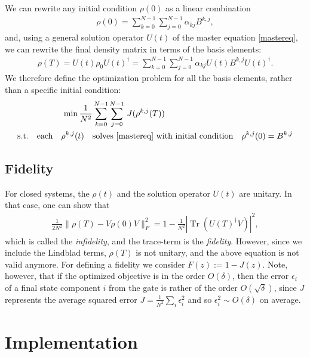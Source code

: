 \documentclass[letterpaper]{article}
\DeclareMathOperator{\Tr}{Tr}
\begin{document}
We can rewrite any initial condition $\rho(0)$ as a linear combination 
\begin{align}
  \rho(0) = \sum_{k=0}^{N-1} \sum_{j=0}^{N-1} \alpha_{kj} B^{k, j},
\end{align}
and, using a general solution operator $U(t)$ of the master equation \eqref{mastereq}, we can rewrite the final density matrix in terms of the basis elements:
\begin{align}
  \rho(T) = U(t) \rho_0 U(t)^\dag = \sum_{k=0}^{N-1} \sum_{j=0}^{N-1} \alpha_{kj} U(t)B^{k, j}U(t)^\dag.
\end{align}
We therefore define the optimization problem for all the basis elements, rather than a specific initial condition:
\begin{align}\label{optimproblem_basis}
  \min \frac{1}{N^2} & \sum_{k=0}^{N-1}\sum_{j=0}^{N-1} \, J(\rho^{k,j}(T))  \\
  \text{s.t.} \quad  \text{each} \quad \rho^{k,j}(t) \quad & \text{solves \eqref{mastereq} with initial condition} \quad \rho^{k,j}(0) = B^{k,j}
\end{align}


\subsection{Fidelity} 
For closed systems, the $\rho(t)$ and the solution operator $U(t)$ are unitary. In that case, one can show that 
\begin{align}
  \frac{1}{2N^2}\|\rho(T) - V\rho(0)V\|_F^2 = 1 - \frac{1}{N^2}|\Tr(U(T)^{\dagger}V)|^2,
\end{align}
which is called the \textit{infidelity}, and the trace-term is the \textit{fidelity}. However, since we include the Lindblad terms, $\rho(T)$ is not unitary, and the above equation is not valid anymore. For defining a fidelity we consider $F(z) := 1 - J(z)$. Note, however, that if the optimized objective is in the order $O(\delta)$, then the error $\epsilon_i$ of a final state component $i$ from the gate is rather of the order $O(\sqrt{\delta})$, since $J$ represents the average squared error $J = \frac{1}{N^2}\sum_i \epsilon_i^2$ and so $\epsilon_i^2 \sim O(\delta)$ on average.

\section{Implementation}
\end{document}
